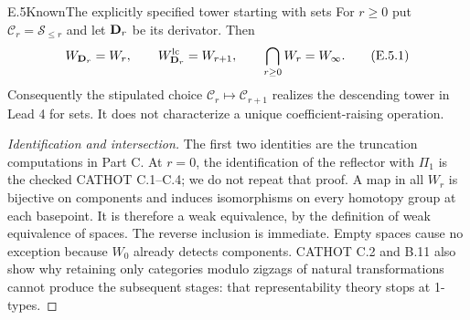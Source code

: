 \begin{claim}{E.5}{Known}{The explicitly specified tower starting with sets}
For $r\ge0$ put $\mathcal C_r=\mathcal S_{\le r}$ and let
$\mathbf D_r$ be its derivator.  Then
\[
 W_{\mathbf D_r}=W_r,\qquad W_{\mathbf D_r}^{\mathrm{lc}}=W_{r+1},\qquad
 \bigcap_{r\ge0}W_r=W_\infty.                                 \tag{E.5.1}
\]
Consequently the stipulated choice $\mathcal C_r\mapsto
\mathcal C_{r+1}$ realizes the descending tower in Lead 4 for sets.
It does not characterize a unique coefficient-raising operation.
\end{claim}
\begin{proof}[Identification and intersection]
The first two identities are the truncation computations in Part C.
At $r=0$, the identification of the reflector with $\Pi_1$ is the
checked CATHOT C.1--C.4; we do not repeat that proof.  A map in all
$W_r$ is bijective on components and induces isomorphisms on every
homotopy group at each basepoint.  It is therefore a weak equivalence,
by the definition of weak equivalence of spaces.  The reverse inclusion
is immediate.  Empty spaces cause no exception because $W_0$ already
detects components.  CATHOT C.2 and B.11 also show why retaining only
categories modulo zigzags of natural transformations cannot produce
the subsequent stages: that representability theory stops at 1-types.
\end{proof}

